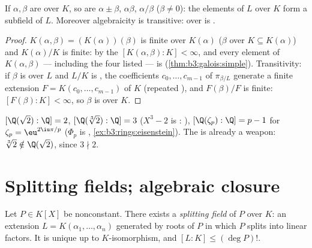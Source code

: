\begin{corollary}\label{cor:b3:galois:algclosed}
If $\alpha, \beta$ are  over $K$, so are $\alpha \pm
\beta$, $\alpha\beta$, $\alpha/\beta$ ($\beta \ne 0$): the
elements of $L$  over $K$ form a subfield of $L$.
Moreover algebraicity is transitive:  over  is
.
\end{corollary}

\begin{proof}
$K(\alpha, \beta) = (K(\alpha))(\beta)$ is finite over
$K(\alpha)$ ($\beta$  over $K \subseteq K(\alpha)$) and
$K(\alpha)/K$ is finite: by the  $[K(\alpha,\beta):K] <
\infty$, and every element of $K(\alpha, \beta)$ --- including
the four listed --- is  (\cref{thm:b3:galois:simple}).
Transitivity: if $\beta$ is  over $L$ and $L/K$ is
, the coefficients $c_0, \dots, c_{m-1}$ of
$\pi_{\beta/L}$ generate a finite extension $F = K(c_0, \dots,
c_{m-1})$ of $K$ (repeated ), and $F(\beta)/F$ is
finite: $[F(\beta):K] < \infty$, so $\beta$ is  over
$K$.
\end{proof}

\begin{example}\label{ex:b3:galois:degrees}
$[\Q(\sqrt2):\Q] = 2$, $[\Q(\sqrt[3]2):\Q] = 3$ ($X^3 - 2$ is
: ), $[\Q(\zeta_p):\Q] = p - 1$ for
$\zeta_p = \eu^{2\iu\pi/p}$ ($\Phi_p$ is ,
\cref{ex:b3:rings:eisenstein}). The  is already a
weapon: $\sqrt[3]2 \notin \Q(\sqrt2)$, since $3 \nmid 2$.
\end{example}

\section{Splitting fields; algebraic closure}

\begin{theorem}\label{thm:b3:galois:splitting}
Let $P \in K[X]$ be nonconstant. There exists a \emph{splitting
field} of $P$ over $K$: an extension $L =
K(\alpha_1, \dots, \alpha_n)$ generated by roots of $P$ in which
$P$ splits into linear factors. It is unique up to
$K$-isomorphism, and $[L:K] \leq (\deg P)!$.
\end{theorem}

